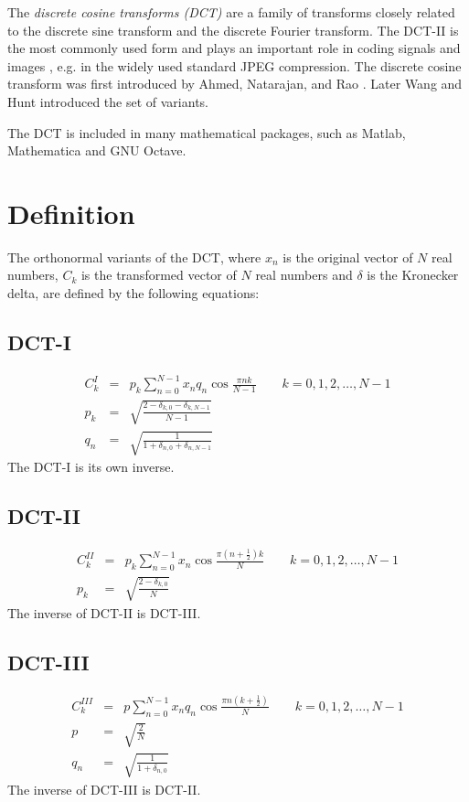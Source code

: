 \documentclass{article}
\begin{document}
The \emph{discrete cosine transforms (DCT)} are a family of  transforms closely related to the discrete sine transform and the discrete Fourier transform. The DCT-II is the most commonly used form and plays an important role in coding signals and images \cite{Jain89}, e.g. in the widely used standard JPEG compression. The discrete cosine transform was first introduced by Ahmed, Natarajan, and Rao \cite{DCT}. Later Wang and Hunt \cite{DWT} introduced the  set of variants.

The DCT is included in many mathematical packages, such as Matlab, Mathematica and GNU Octave.

\section{Definition}

The orthonormal variants of the DCT, where $x_n$ is the original vector of $N$ real numbers, $C_k$ is the transformed vector of $N$ real numbers and $\delta$ is the Kronecker delta, are defined by the following equations:

\subsection{DCT-I}
\begin{eqnarray*}
C^I_k&=&p_k \sum _{n=0}^{N-1} x_n q_n \cos \frac{\pi n k}{N-1} \quad \quad k=0, 1, 2, \dots, N-1\\
p_k&=&\sqrt{\frac{2-\delta _{k,0}-\delta _{k,N-1}}{N-1}}\\
q_n&=&\sqrt{\frac{1}{1+\delta _{n,0}+\delta _{n,N-1}}}
\end{eqnarray*}
The DCT-I is its own inverse.

\subsection{DCT-II}
\begin{eqnarray*}
C^{II}_k&=&p_k \sum _{n=0}^{N-1} x_n \cos \frac{\pi \left(n+\frac{1}{2}\right) k}{N} \quad \quad k=0, 1, 2, \dots, N-1\\
p_k&=&\sqrt{\frac{2-\delta _{k,0}}{N}}
\end{eqnarray*}
The inverse of DCT-II is DCT-III.

\subsection{DCT-III}
\begin{eqnarray*}
C^{III}_k&=&p \sum _{n=0}^{N-1} x_n q_n \cos \frac{\pi n \left(k+\frac{1}{2}\right)}{N} \quad \quad k=0, 1, 2, \dots, N-1\\
p&=&\sqrt{\frac{2}{N}}\\
q_n&=&\sqrt{\frac{1}{1+\delta _{n,0}}}
\end{eqnarray*}
The inverse of DCT-III is DCT-II.
\end{document}

